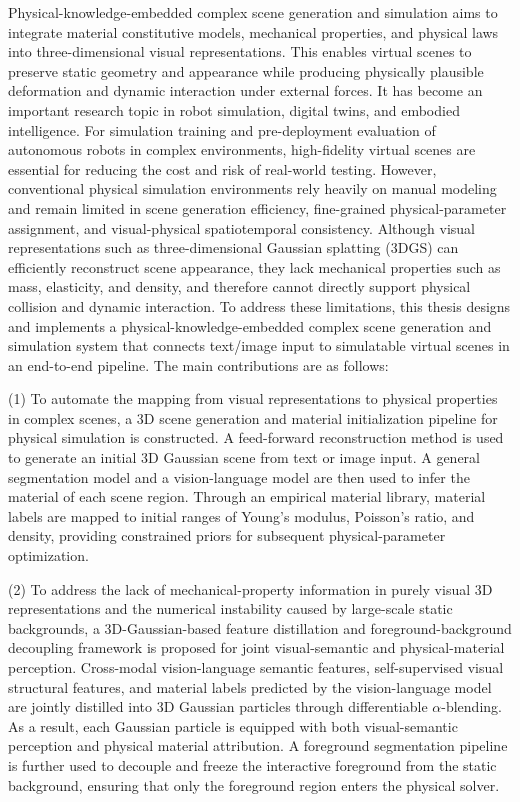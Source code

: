 \begin{engabstract}
    Physical-knowledge-embedded complex scene generation and simulation aims to integrate material constitutive models, mechanical properties, and physical laws into three-dimensional visual representations. This enables virtual scenes to preserve static geometry and appearance while producing physically plausible deformation and dynamic interaction under external forces. It has become an important research topic in robot simulation, digital twins, and embodied intelligence. For simulation training and pre-deployment evaluation of autonomous robots in complex environments, high-fidelity virtual scenes are essential for reducing the cost and risk of real-world testing. However, conventional physical simulation environments rely heavily on manual modeling and remain limited in scene generation efficiency, fine-grained physical-parameter assignment, and visual-physical spatiotemporal consistency. Although visual representations such as three-dimensional Gaussian splatting (3DGS) can efficiently reconstruct scene appearance, they lack mechanical properties such as mass, elasticity, and density, and therefore cannot directly support physical collision and dynamic interaction. To address these limitations, this thesis designs and implements a physical-knowledge-embedded complex scene generation and simulation system that connects text/image input to simulatable virtual scenes in an end-to-end pipeline. The main contributions are as follows:

    (1) To automate the mapping from visual representations to physical properties in complex scenes, a 3D scene generation and material initialization pipeline for physical simulation is constructed. A feed-forward reconstruction method is used to generate an initial 3D Gaussian scene from text or image input. A general segmentation model and a vision-language model are then used to infer the material of each scene region. Through an empirical material library, material labels are mapped to initial ranges of Young's modulus, Poisson's ratio, and density, providing constrained priors for subsequent physical-parameter optimization.

    (2) To address the lack of mechanical-property information in purely visual 3D representations and the numerical instability caused by large-scale static backgrounds, a 3D-Gaussian-based feature distillation and foreground-background decoupling framework is proposed for joint visual-semantic and physical-material perception. Cross-modal vision-language semantic features, self-supervised visual structural features, and material labels predicted by the vision-language model are jointly distilled into 3D Gaussian particles through differentiable $\alpha$-blending. As a result, each Gaussian particle is equipped with both visual-semantic perception and physical material attribution. A foreground segmentation pipeline is further used to decouple and freeze the interactive foreground from the static background, ensuring that only the foreground region enters the physical solver.


\end{engabstract}

